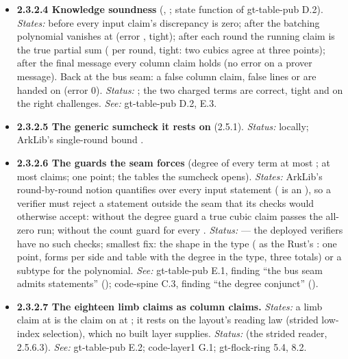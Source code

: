 \begin{itemize}[label={}, leftmargin=1.3em, itemindent=-1.3em, labelwidth=0pt, labelsep=0pt, itemsep=4pt, topsep=3pt]
\item {}\label{obl:node-2.3.2.4}\textbf{2.3.2.4 Knowledge soundness} (, ; state function of gt-table-pub D.2). \emph{States:} before  every input claim's discrepancy is zero; after  the batching polynomial  vanishes at  (error , tight); after each round the running claim is the true partial sum ( per round, tight: two cubics agree at three points); after the final message every column claim holds (no error on a prover message). Back at the bus seam: a false column claim, false lines or  are handed on (error 0). \emph{Status:} ; the two charged terms are correct, tight and on the right challenges. \emph{See:} gt-table-pub D.2, E.3.
\item {}\label{obl:node-2.3.2.5}\textbf{2.3.2.5 The generic sumcheck it rests on} (2.5.1). \emph{Status:}  locally; ArkLib's single-round bound .
\item {}\label{obl:node-2.3.2.6}\oblflag\textbf{2.3.2.6 The guards the seam forces} (degree of every term at most ; at most  claims; one point; the tables the sumcheck opens). \emph{States:} ArkLib's round-by-round notion quantifies over every input statement ( is an ), so a verifier must reject a statement outside the seam that its checks would otherwise accept: without the degree guard a true cubic claim passes the all-zero run; without the count guard  for every . \emph{Status:}   — the deployed verifiers have no such checks; smallest fix: the shape in the type ( as the Rust's : one point, forms per side and table with the degree in the type, three totals) or a subtype for the polynomial. \emph{See:} gt-table-pub E.1, finding ``the bus seam admits statements'' (); code-spine C.3, finding ``the degree conjunct'' ().
\item {}\label{obl:node-2.3.2.7}\oblflag\textbf{2.3.2.7 The eighteen limb claims as column claims.} \emph{States:} a limb claim at  is the claim on  at ; it rests on the layout's reading law (strided low-index selection), which no built layer supplies. \emph{Status:}   (the strided reader, 2.5.6.3). \emph{See:} gt-table-pub E.2; code-layer1 G.1; gt-flock-ring 5.4, 8.2.
\end{itemize}

